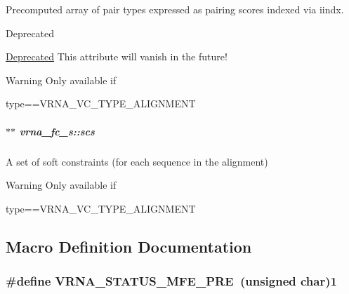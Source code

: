 Precomputed array of pair types expressed as pairing scores indexed via iindx. 

\begin{DoxyRefDesc}{Deprecated}
\item[\hyperlink{deprecated__deprecated000052}{Deprecated}]This attribute will vanish in the future! \end{DoxyRefDesc}
\begin{DoxyWarning}{Warning}
Only available if\begin{DoxyVerb}type==VRNA_VC_TYPE_ALIGNMENT \end{DoxyVerb}
 
\end{DoxyWarning}
\subparagraph[{\texorpdfstring{scs}{scs}}]{$\ast$$\ast$ vrna\+\_\+fc\+\_\+s\+::scs}\hypertarget{group__fold__compound_ac2b047fddabc51a76a96511174e47db1}{}\label{group__fold__compound_ac2b047fddabc51a76a96511174e47db1}


A set of soft constraints (for each sequence in the alignment) 

\begin{DoxyWarning}{Warning}
Only available if\begin{DoxyVerb}type==VRNA_VC_TYPE_ALIGNMENT \end{DoxyVerb}
 
\end{DoxyWarning}


\subsection{Macro Definition Documentation}
\subsubsection[{\texorpdfstring{V\+R\+N\+A\+\_\+\+S\+T\+A\+T\+U\+S\+\_\+\+M\+F\+E\+\_\+\+P\+RE}{VRNA_STATUS_MFE_PRE}}]{\setlength{\rightskip}{0pt plus 5cm}\#define V\+R\+N\+A\+\_\+\+S\+T\+A\+T\+U\+S\+\_\+\+M\+F\+E\+\_\+\+P\+RE~(unsigned char)1}\hypertarget{group__fold__compound_ga1a5053dc8acbb0111e852988726f07d6}{}\label{group__fold__compound_ga1a5053dc8acbb0111e852988726f07d6}


